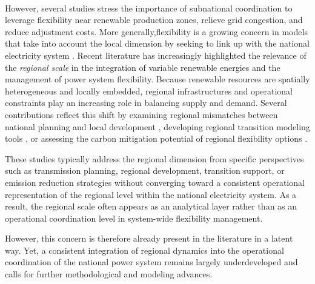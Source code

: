 \documentclass[12pt]{article}
\begin{document}
\paragraph{}
However, several studies \citep{maia2019,bai2022,chen2020} stress the importance of subnational coordination to leverage flexibility near
renewable production zones, relieve grid congestion, and reduce adjustment costs. More generally,flexibility is a growing concern in models that take into account the local dimension by seeking to link up with the national electricity system \citep[p.~18--20]{chang2021trends}. Recent literature has increasingly highlighted the relevance of the \textit{regional scale} in the integration of variable renewable energies and the management of power system flexibility. Because renewable resources are spatially heterogeneous and locally embedded, regional infrastructures and operational constraints play an increasing role in balancing supply and demand. Several contributions reflect this shift by examining regional mismatches between national planning and local development \citep{Nielsen2023TransmissionMismatch}, developing regional transition modeling tools \citep{Sahoo2023RegionalTransitionTool}, or assessing the carbon mitigation potential of regional flexibility options \citep{Deng2024FlexibilityCarbon}. 

These studies typically address the regional dimension from specific perspectives such as transmission planning, regional development, transition support, or emission reduction strategies without converging toward a consistent operational representation of the regional level within the national electricity system. As a result, the regional scale often appears as an analytical layer rather than as an operational coordination level in system-wide flexibility management.

However, this concern is therefore already present in the literature in a latent way. Yet, a consistent integration of regional dynamics into the operational coordination of the national power system remains largely underdeveloped and calls for further methodological and modeling advances.
\end{document}
